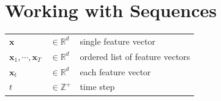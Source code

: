 \section{Working with Sequences \cite{dnn-1}}

\begin{customTableWrapper}{1.5}
\begin{longtable}{l l p{8cm}}
    $\mathbf{x}$ & $\in \mathbb{R}^d$ & single feature vector \\
    $\mathbf{x}_1, \cdots, \mathbf{x}_T$ & $\in \mathbb{R}^d$ & ordered list of feature vectors \\
    $\mathbf{x}_t$ & $\in \mathbb{R}^d$ & each feature vector \\
    $t$ & $\in \mathbb{Z}^+$ & time step \\
\end{longtable}
\end{customTableWrapper}


